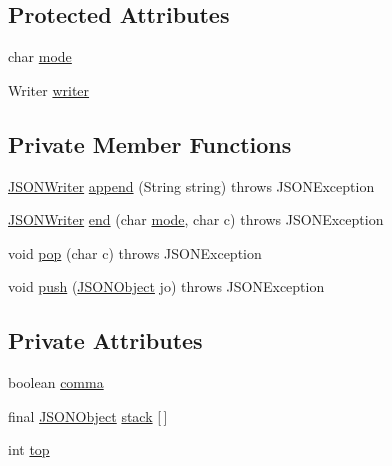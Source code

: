 \subsection*{Protected Attributes}
\begin{DoxyCompactItemize}
\item 
char \hyperlink{classorg_1_1json_1_1_j_s_o_n_writer_acabe6b245b148eabfaa3cf975f98073f}{mode}
\item 
Writer \hyperlink{classorg_1_1json_1_1_j_s_o_n_writer_ae5398a9b83a17ab31c993c52fc1c8e06}{writer}
\end{DoxyCompactItemize}
\subsection*{Private Member Functions}
\begin{DoxyCompactItemize}
\item 
\hyperlink{classorg_1_1json_1_1_j_s_o_n_writer}{J\-S\-O\-N\-Writer} \hyperlink{classorg_1_1json_1_1_j_s_o_n_writer_a68cca8bb48159b1cb6b3ca10b70d837e}{append} (String string)  throws J\-S\-O\-N\-Exception 
\item 
\hyperlink{classorg_1_1json_1_1_j_s_o_n_writer}{J\-S\-O\-N\-Writer} \hyperlink{classorg_1_1json_1_1_j_s_o_n_writer_ad858ebf7b9b5cb50288ed4c2f6882614}{end} (char \hyperlink{classorg_1_1json_1_1_j_s_o_n_writer_acabe6b245b148eabfaa3cf975f98073f}{mode}, char c)  throws J\-S\-O\-N\-Exception 
\item 
void \hyperlink{classorg_1_1json_1_1_j_s_o_n_writer_a7c0de62466d96075b112f921c588d462}{pop} (char c)  throws J\-S\-O\-N\-Exception 
\item 
void \hyperlink{classorg_1_1json_1_1_j_s_o_n_writer_af52fc5a46190837106c20d17dd58d2f5}{push} (\hyperlink{classorg_1_1json_1_1_j_s_o_n_object}{J\-S\-O\-N\-Object} jo)  throws J\-S\-O\-N\-Exception 
\end{DoxyCompactItemize}
\subsection*{Private Attributes}
\begin{DoxyCompactItemize}
\item 
boolean \hyperlink{classorg_1_1json_1_1_j_s_o_n_writer_a2370b9e0c4400cc324ba5fb32a1ed311}{comma}
\item 
final \hyperlink{classorg_1_1json_1_1_j_s_o_n_object}{J\-S\-O\-N\-Object} \hyperlink{classorg_1_1json_1_1_j_s_o_n_writer_a06c3b64f8f98ba2bb2a3f57b1c5b328f}{stack} \mbox{[}$\,$\mbox{]}
\item 
int \hyperlink{classorg_1_1json_1_1_j_s_o_n_writer_a2da85e29823056f58034b8723b7da082}{top}
\end{DoxyCompactItemize}
